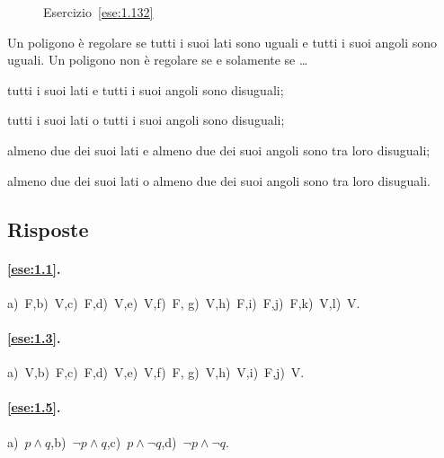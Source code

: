 \begin{inaccessibleblock}
 \begin{figure}[htb]
 \centering
 \caption{Esercizio~\ref{ese:1.132}}\label{fig:ese1.132}
\end{figure}
\end{inaccessibleblock}


\begin{esercizio}
\label{ese:1.133}
Un poligono è regolare se tutti i suoi lati sono uguali e tutti i 
suoi angoli sono uguali. Un poligono non è regolare se e solamente se 
\ldots
\begin{enumeratea}
\item tutti i suoi lati e tutti i suoi angoli sono disuguali;
\item tutti i suoi lati o tutti i suoi angoli sono disuguali;
\item almeno due dei suoi lati e almeno due dei suoi angoli sono tra 
loro disuguali;
\item almeno due dei suoi lati o almeno due dei suoi angoli sono tra 
loro disuguali.
\end{enumeratea}
\end{esercizio}


\subsection{Risposte}

\begingroup
\hypersetup{linkcolor=black}

\paragraph{\ref{ese:1.1}.}
a)~F,\quad b)~V,\quad c)~F,\quad d)~V,\quad e)~V,\quad f)~F,\quad 
g)~V,\quad h)~F,\quad i)~F,\quad j)~F,\quad k)~V,\quad l)~V.

\paragraph{\ref{ese:1.3}.}
a)~V,\quad b)~F,\quad c)~F,\quad d)~V,\quad e)~V,\quad f)~F,\quad 
g)~V,\quad h)~V,\quad i)~F,\quad j)~V.

\paragraph{\ref{ese:1.5}.}
a)~$p\wedge q$,\quad b)~$\neg p\wedge q$,\quad c)~$p\wedge \neg 
q$,\quad d)~$\neg p \wedge \neg q$.

